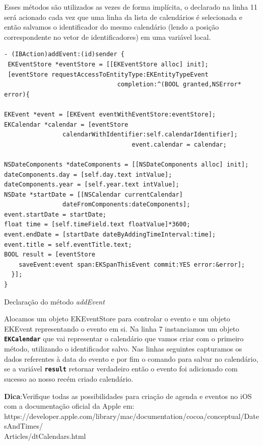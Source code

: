 \documentclass[a4paper,12pt,brazil,oneside]{book}
\begin{document}
Esses métodos são utilizados as vezes de forma implícita, o declarado na linha 11 será acionado cada vez que uma linha da lista de calendários é selecionada e então salvamos o identificador do mesmo calendário (lendo a posição correspondente no vetor de identificadores) em uma variável local.

\begin{listing}[H]
\begin{verbatim}
- (IBAction)addEvent:(id)sender {
 EKEventStore *eventStore = [[EKEventStore alloc] init];
 [eventStore requestAccessToEntityType:EKEntityTypeEvent
                               completion:^(BOOL granted,NSError* error){

EKEvent *event = [EKEvent eventWithEventStore:eventStore];
EKCalendar *calendar = [eventStore 
				calendarWithIdentifier:self.calendarIdentifier];
                                   event.calendar = calendar;

NSDateComponents *dateComponents = [[NSDateComponents alloc] init];
dateComponents.day = [self.day.text intValue];
dateComponents.year = [self.year.text intValue];
NSDate *startDate = [[NSCalendar currentCalendar] 
				dateFromComponents:dateComponents];
event.startDate = startDate;
float time = [self.timeField.text floatValue]*3600;
event.endDate = [startDate dateByAddingTimeInterval:time];
event.title = self.eventTitle.text;
BOOL result = [eventStore 
	saveEvent:event span:EKSpanThisEvent commit:YES error:&error];
  }];
}
\end{verbatim}
\caption{Declaração do método \emph{addEvent}}
\end{listing}

Alocamos um objeto EKEventStore para controlar o evento e um objeto EKEvent representando o evento em si. Na linha 7 instanciamos um objeto  \texttt{\textbf{EKCalendar}} que vai representar o calendário que vamos criar com o primeiro método, utilizando o identificador salvo.
Nas linhas seguintes capturamos os dados referentes à data do evento e por fim o comando para salvar no calendário, se a variável \texttt{\textbf{result}} retornar verdadeiro então o evento foi adicionado com sucesso ao nosso recém criado calendário.

\begin{framed}

\textbf{Dica}:Verifique todas as possibilidades para criação de agenda e eventos no iOS com a documentação oficial da Apple em:\\ https://developer.apple.com/library/mac/documentation/cocoa/conceptual/DatesAndTimes/\\Articles/dtCalendars.html
\end{framed}
\end{document}
